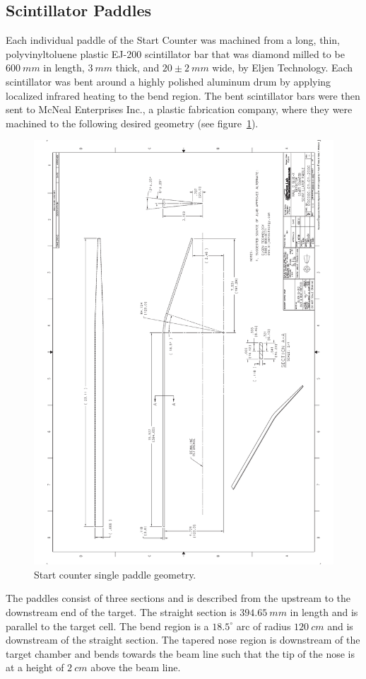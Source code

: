 \subsection{Scintillator Paddles}

Each individual paddle of the Start Counter was machined from a long, thin, polyvinyltoluene plastic EJ-200 scintillator bar that was diamond milled to be $600\ mm$ in length, $3\ mm$ thick, and $20 \pm 2\ mm$ wide, by Eljen Technology.  Each scintillator was bent around a highly polished aluminum drum by applying localized infrared heating to the bend region.  The bent scintillator bars were then sent to McNeal Enterprises Inc., a plastic fabrication company, where they were machined to the following desired geometry (see figure~\ref{fig:Scintillator Geometry}).
\begin{figure}[!htb]
	\centering
	\includegraphics[width=0.7\columnwidth,angle=270.]{design/figs/Scint_Geo}
	\caption[Start counter single paddle geometry]{Start counter single paddle geometry.}
	\label{fig:Scintillator Geometry}
\end{figure}

The paddles consist of three sections and is described from the upstream to the downstream end of the target.  The straight section is $394.65\ mm$ in length and is parallel to the target cell.  The bend region is a $18.5^{\circ}$ arc of radius $120\ cm$ and is downstream of the straight section. The tapered nose region is downstream of the target chamber and bends towards the beam line such that the tip of the nose is at a height of $2\ cm$ above the beam line.  

